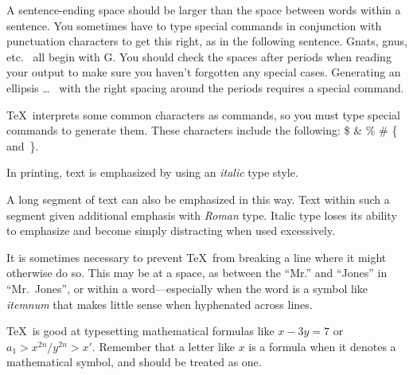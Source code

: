 \documentclass{river-journal}
\begin{document}
A sentence-ending space should be larger than the space between words
within a sentence.  You sometimes have to type special commands in
conjunction with punctuation characters to get this right, as in the
following sentence.
       Gnats, gnus, etc.\    %
       all begin with G\@.   %
You should check the spaces after periods when reading your output to
make sure you haven't forgotten any special cases.
Generating an ellipsis
       \ldots\    %
with the right spacing around the periods
requires a special  command.

\TeX\ interprets some common characters as commands, so you must type
special commands to generate them.  These characters include the
following:
       \$ \& \% \# \{ and~\}.

In printing, text is emphasized by using an
       {\em italic\/}  %
type style.

\begin{em}
   A long segment of text can also be emphasized in this way.  Text within
   such a segment given additional emphasis
      with\/ {\em Roman}
   type.  Italic type loses its ability to emphasize and become simply
   distracting when used excessively.
\end{em}

It is sometimes necessary to prevent \TeX\ from breaking a line where
it might otherwise do so.  This may be at a space, as between the
``Mr.'' and ``Jones'' in
       ``Mr.~Jones'',        %
or within a word---especially when the word is a symbol like
       \mbox{\em itemnum\/}
that makes little sense when hyphenated across
       lines.





\TeX\ is good at typesetting mathematical formulas like
       \( x-3y = 7 \)
or
       \( a_{1} > x^{2n} / y^{2n} > x' \).
Remember that a letter like
       $x$        %
is a formula when it denotes a mathematical symbol, and should
be treated as one.
\end{document}
